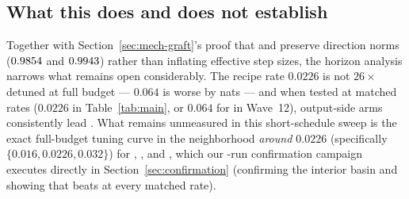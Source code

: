 \subsection{What this does and does not establish}

Together with Section~\ref{sec:mech-graft}'s proof that \mlpdiag{} and
\alldiag{} preserve direction norms ($0.9854{}$ and
$0.9943{}$) rather than inflating effective step sizes, the
horizon analysis narrows what remains open considerably. The recipe rate
$0.0226$ is not $26\times$ detuned at full budget --- $0.064$ is worse by
\waveTwelveMuontSelDiffMag{} nats --- and when tested at matched rates ($0.0226$
in Table~\ref{tab:main}, or $0.064$ for \fused{} in Wave~12), output-side arms
consistently lead \muont{}. What remains unmeasured in this short-schedule sweep is the exact full-budget
tuning curve in the neighborhood \emph{around $0.0226$} (specifically
$\{0.016, 0.0226, 0.032\}$) for \muont{}, \mlpdiaglag{}, and \alldiag{}, which
our \confTotalRuns{}-run confirmation campaign executes directly in
Section~\ref{sec:confirmation} (confirming the interior basin and showing that
 beats  at every matched rate).
